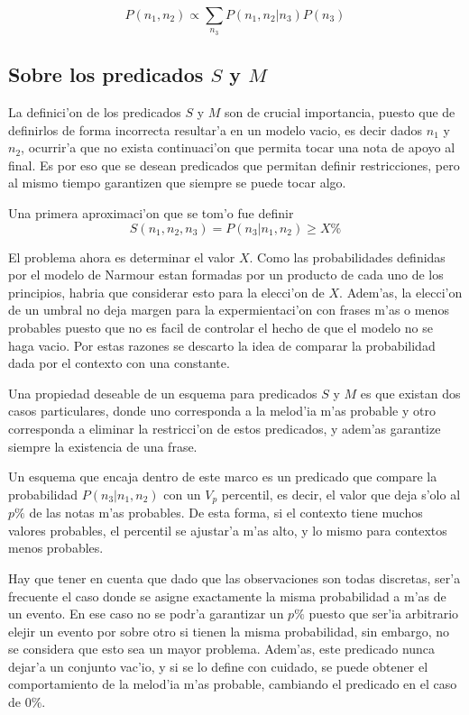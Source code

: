 $$P(n_1, n_2) \propto \sum_{n_3}P(n_1,n_2|n_3)P(n_3)$$



\subsection{Sobre los predicados $S$ y $M$}
\label{sec:must_predicates}
La definici'on de los predicados $S$ y $M$ son de crucial importancia, puesto que de definirlos de forma incorrecta resultar'a en un modelo vacio, 
es decir dados $n_1$ y $n_2$, ocurrir'a que no exista continuaci'on que permita tocar una nota de apoyo al final. 
Es por eso que se desean predicados que permitan definir restricciones, pero al mismo tiempo garantizen que siempre se puede tocar algo.

Una primera aproximaci'on que se tom'o fue definir 
$$S(n_1, n_2, n_3) = P(n_3 | n_1, n_2) \geq X\%$$

El problema ahora es determinar
el valor $X$. Como las probabilidades definidas por el modelo de Narmour estan formadas por un producto de cada uno de los principios, habria 
que considerar esto para la elecci'on de $X$. Adem'as, la elecci'on de un umbral no deja margen para la expermientaci'on con frases
m'as o menos probables puesto que no es facil de controlar el hecho de que el modelo no se haga vacio. 
Por estas razones se descarto la idea de comparar la probabilidad dada por el contexto con una constante. 

Una propiedad deseable de un esquema para predicados $S$ y $M$ es que existan dos casos particulares, 
donde uno corresponda a la melod'ia m'as probable
y otro corresponda a eliminar la restricci'on de estos predicados, y adem'as garantize siempre la existencia de una frase. 

Un esquema que encaja dentro de este marco es un predicado que compare la probabilidad $P(n_3 | n_1, n_2)$ con un 
$V_p$ percentil, es decir, el valor que deja s'olo al $p\%$ de las notas m'as probables.  De esta forma, si el contexto tiene muchos valores probables, 
el percentil se ajustar'a m'as alto, y lo mismo para contextos menos probables.

Hay que tener en cuenta que dado que las observaciones son todas discretas, ser'a frecuente el caso donde 
se asigne exactamente la misma probabilidad a m'as de un evento. En ese caso no se podr'a garantizar un $p\%$ puesto que ser'ia arbitrario
elejir un evento por sobre otro si tienen la misma probabilidad, sin embargo, no se considera que esto sea un mayor problema. Adem'as, este predicado nunca dejar'a un conjunto vac'io, y si se lo define con cuidado, se puede obtener
el comportamiento de la melod'ia m'as probable, cambiando el predicado en el caso de $0\%$.

